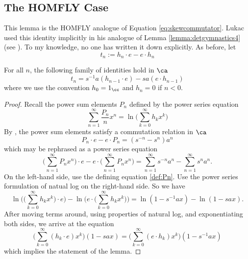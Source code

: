 \subsection{The HOMFLY Case}


This lemma is the HOMFLY analogue of Equation \eqref{eq:skewcommutator}. Lukac used this identity implicitly in his analogue of Lemma \ref{lemma:detgymnastics4} (see \cite[Lemma 8.4]{Luk05}). To my knowledge, no one has written it down explicitly. As before, let
\[
t_n := h_n \cdot e - e \cdot h_n
\]
\begin{lemma} \label{lem:homfly1}
For all $n$, the following family of identities hold in $\ca$
\begin{equation*} 
t_n = s^{-1} a ( h_{n-1} \cdot e ) - s a ( e \cdot h_{n-1} )
\end{equation*}
where we use the convention $h_0 = 1_\cc$ and $h_n = 0$ if $n < 0$. 
\end{lemma}
\begin{proof}
Recall the power sum elements $P_n$ defined by the power series equation
\begin{equation} \label{def:Pn}
\sum_{n=1}^\infty \frac{P_n}{n} x^n = \ln \Big( \sum_{k=0}^\infty h_k x^k \Big)
\end{equation}
By \cite[Theorem 4.2]{Mor02b}, the power sum elements satisfy a commutation relation in $\ca$
\begin{equation}
P_n \cdot e - e \cdot P_n = (s^{-n} - s^n) a^n
\end{equation} 
which may be rephrased as a power series equation 
\[
\Big( \sum_{n=1}^\infty P_n x^n \Big) \cdot e - e \cdot \Big( \sum_{n=1}^\infty P_n x^n \Big) = \sum_{n=1}^\infty s^{-n} a^n - \sum_{n=1}^\infty s^n a^n.
\]
On the left-hand side, use the defining equation \eqref{def:Pn}. Use the power series formulation of natual log on the right-hand side. So we have
\[
\ln \Bigg( \Big( \sum_{k=0}^\infty h_k x^k \Big) \cdot e \Bigg) - \ln \Bigg( e \cdot \Big( \sum_{k=0}^\infty h_k x^k \Big) \Bigg) = \ln ( 1 - s^{-1} a x ) - \ln ( 1 - s a x ).
\]
After moving terms around, using properties of natural log, and exponentiating both sides, we arrive at the equation
\[
\Big( \sum_{k=0}^\infty (h_k \cdot e ) x^k \Big) ( 1 - s a x ) = \Big( \sum_{k=0}^\infty ( e \cdot h_k ) x^k \Big) ( 1 - s^{-1} a x )
\]
which implies the statement of the lemma.
\end{proof}

